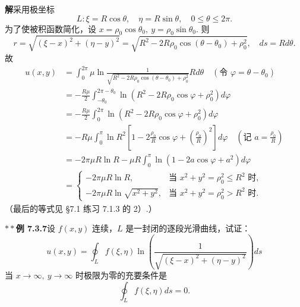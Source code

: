 \documentclass[UTF8, 12pt, fontset=fandol, oneside]{ctexart}
\begin{document}
\noindent\textbf{解}\quad 采用极坐标
\[
L:\xi=R\cos\theta,\quad \eta=R\sin\theta,\quad 0\le\theta\le2\pi.
\]
为了使被积函数简化，设 $x=\rho_0\cos\theta_0,\ y=\rho_0\sin\theta_0$. 则
\[
r=\sqrt{(\xi-x)^2+(\eta-y)^2}
=\sqrt{R^2-2R\rho_0\cos(\theta-\theta_0)+\rho_0^2},\quad ds=Rd\theta.
\]
故
\[
\begin{aligned}
u(x,y)
&=\int_0^{2\pi}\mu\ln
\frac1{\sqrt{R^2-2R\rho_0\cos(\theta-\theta_0)+\rho_0^2}}Rd\theta
\quad(\text{令 }\varphi=\theta-\theta_0)\\
&=-\frac{R\mu}{2}\int_{-\theta_0}^{2\pi-\theta_0}
\ln(R^2-2R\rho_0\cos\varphi+\rho_0^2)d\varphi\\
&=-\frac{R\mu}{2}\int_0^{2\pi}
\ln(R^2-2R\rho_0\cos\varphi+\rho_0^2)d\varphi\\
&=-R\mu\int_0^\pi
\ln R^2\left[1-2\frac{\rho_0}{R}\cos\varphi
+\left(\frac{\rho_0}{R}\right)^2\right]d\varphi
\quad\left(\text{记 }a=\frac{\rho_0}{R}\right)\\
&=-2\pi\mu R\ln R-\mu R\int_0^\pi
\ln(1-2a\cos\varphi+a^2)d\varphi\\
&=
\begin{cases}
-2\pi\mu R\ln R,&\text{当 }x^2+y^2=\rho_0^2\le R^2\text{ 时},\\
-2\pi\mu R\ln\sqrt{x^2+y^2},&\text{当 }x^2+y^2=\rho_0^2>R^2\text{ 时}.
\end{cases}
\end{aligned}
\]
（最后的等式见 §7.1 练习 7.1.3 的 2）.）

\noindent\textbf{$**$例 7.3.7}\quad 设 $f(x,y)$ 连续，$L$ 是一封闭的逐段光滑曲线，试证：
\[
u(x,y)=\oint_Lf(\xi,\eta)\ln\left(\frac1{\sqrt{(\xi-x)^2+(\eta-y)^2}}\right)ds \tag{1}
\]
当 $x\to\infty,\ y\to\infty$ 时极限为零的充要条件是
\[
\oint_Lf(\xi,\eta)ds=0.
\]
\end{document}
